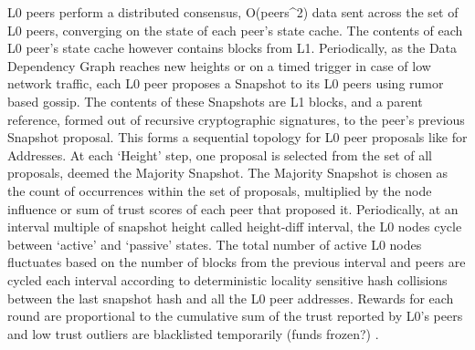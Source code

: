 \documentclass{article}
\begin{document}
	L0 peers perform a distributed consensus, O(peers^2) data sent across the set of L0 peers, converging on the state of each peer’s state cache. The contents of each L0 peer’s state cache however contains blocks from L1. Periodically, as the Data Dependency Graph reaches new heights or on a timed trigger in case of low network traffic, each L0 peer proposes a Snapshot to its L0 peers using rumor based gossip. The contents of these Snapshots are L1 blocks, and a parent reference, formed out of recursive cryptographic signatures, to the peer’s previous Snapshot proposal. This forms a sequential topology for L0 peer proposals like for Addresses. At each ‘Height’ step, one proposal is selected from the set of all proposals, deemed the Majority Snapshot. The Majority Snapshot is chosen as the count of occurrences within the set of proposals, multiplied by the node influence or sum of trust scores of each peer that proposed it.
Periodically, at an interval multiple of snapshot height called height-diff interval, the L0 nodes cycle between ‘active’ and ‘passive’ states. The total number of active L0 nodes fluctuates based on the number of blocks from the previous interval and peers are cycled each interval according to deterministic locality sensitive hash collisions between the last snapshot hash and all the L0 peer addresses. Rewards for each round are proportional to the cumulative sum of the trust reported by L0’s peers and low trust outliers are blacklisted temporarily (funds frozen?) .
\end{document}
